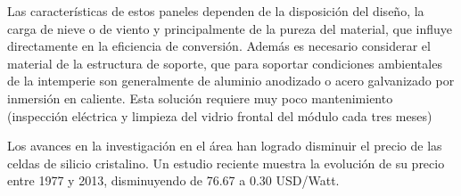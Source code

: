 Las características de estos paneles dependen de la disposición del diseño, la carga de nieve o de viento y principalmente de la pureza del material, que influye directamente en la eficiencia de conversión. Además es necesario considerar el material de la estructura de soporte, que para soportar condiciones ambientales de la intemperie son generalmente de aluminio anodizado o acero galvanizado por inmersión en caliente. Esta solución requiere muy poco mantenimiento (inspección eléctrica y limpieza del vidrio frontal del módulo cada tres meses)


Los avances en la investigación en el área han logrado disminuir el precio de las celdas de silicio cristalino. Un estudio reciente \citep{Bloomberg} muestra la evolución de su precio entre 1977 y 2013, disminuyendo de 76.67 a 0.30 USD/Watt.



